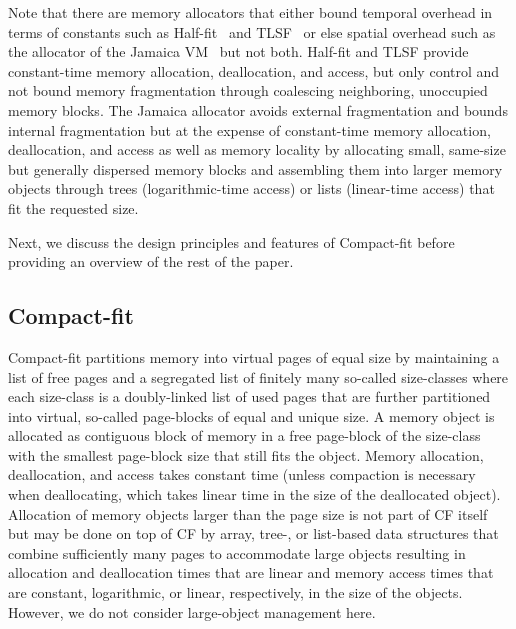 \documentclass{amsart}
\begin{document}
Note that there are memory allocators that either bound temporal
overhead in terms of constants such as Half-fit~\cite{Oga1} and
TLSF~\cite{Mas1} or else spatial overhead such as the allocator of the
Jamaica VM~\cite{Sie2} but not both. Half-fit and TLSF provide
constant-time memory allocation, deallocation, and access, but only
control and not bound memory fragmentation through coalescing
neighboring, unoccupied memory blocks.  The Jamaica allocator avoids
external fragmentation and bounds internal fragmentation but at the
expense of constant-time memory allocation, deallocation, and access
as well as memory locality by allocating small, same-size but
generally dispersed memory blocks and assembling them into larger
memory objects through trees (logarithmic-time access) or lists
(linear-time access) that fit the requested size.

Next, we discuss the design principles and features of Compact-fit
before providing an overview of the rest of the paper.

\subsection{Compact-fit}

Compact-fit partitions memory into virtual pages of equal size by
maintaining a list of free pages and a segregated list of finitely
many so-called size-classes where each size-class is a doubly-linked
list of used pages that are further partitioned into virtual,
so-called page-blocks of equal and unique size.  A memory object is
allocated as contiguous block of memory in a free page-block of the
size-class with the smallest page-block size that still fits the
object.  Memory allocation, deallocation, and access takes constant
time (unless compaction is necessary when deallocating, which takes
linear time in the size of the deallocated object).  Allocation of
memory objects larger than the page size is not part of CF itself but
may be done on top of CF by array, tree-, or list-based data
structures that combine sufficiently many pages to accommodate large
objects resulting in allocation and deallocation times that are linear
and memory access times that are constant, logarithmic, or linear,
respectively, in the size of the objects.  However, we do not consider
large-object management here.
\end{document}
